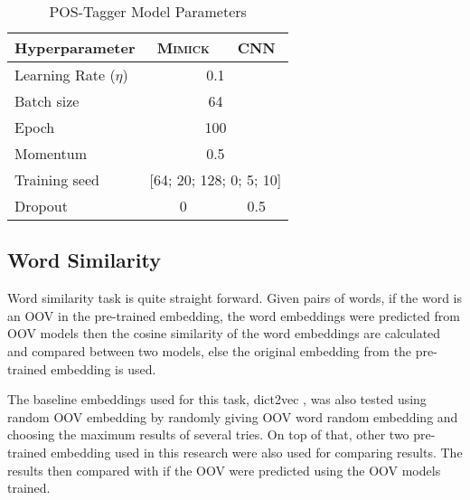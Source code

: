         \begin{table}[]
            \centering
            \caption{POS-Tagger Model Parameters}
            \label{tab:hyperparameterpostag}
            \begin{tabular}{@{}lcc@{}}
                \toprule
                \textbf{Hyperparameter} & \multicolumn{1}{c}{\textbf{\textsc{Mimick}}} & \multicolumn{1}{c}{\textbf{CNN}} \\ \midrule
                Learning Rate ($\eta$) & \multicolumn{2}{c}{0.1} \\
                Batch size & \multicolumn{2}{c}{64} \\
                Epoch & \multicolumn{2}{c}{100} \\
                Momentum & \multicolumn{2}{c}{0.5} \\
                Training seed & \multicolumn{2}{c}{[64; 20; 128; 0; 5;
                10]} \\
                Dropout & 0 & 0.5 \\ 
                \bottomrule
            \end{tabular}
        \end{table}

    \subsection{Word Similarity}
        Word similarity task is quite straight forward. Given pairs of
        words, if the word is an OOV in the pre-trained embedding, the
        word embeddings were predicted from OOV models then the cosine
        similarity of the word embeddings are calculated and compared
        between two models, else the original embedding from the
        pre-trained embedding is used. 
        
        The baseline embeddings used for this task, dict2vec
        \citep{dict2vect2017tissier}, was also tested using random OOV
        embedding by randomly giving OOV word random embedding and
        choosing the maximum results of several tries. On top of that,
        other two pre-trained embedding used in this research were
        also used for comparing results. The results then compared
        with if the OOV were predicted using the OOV models trained.